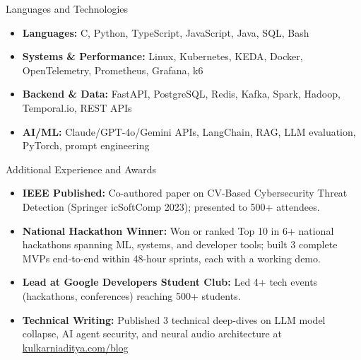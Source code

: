 \documentclass[]{mcdowellcv}
\begin{document}
\begin{cvsection}{Languages and Technologies}
  \begin{cvsubsection}{}{}{}
    \begin{itemize}
      \item \textbf{Languages:} C, Python, TypeScript, JavaScript, Java, SQL, Bash
      \item \textbf{Systems \& Performance:} Linux, Kubernetes, KEDA, Docker, OpenTelemetry, Prometheus, Grafana, k6
      \item \textbf{Backend \& Data:} FastAPI, PostgreSQL, Redis, Kafka, Spark, Hadoop, Temporal.io, REST APIs
      \item \textbf{AI/ML:} Claude/GPT-4o/Gemini APIs, LangChain, RAG, LLM evaluation, PyTorch, prompt engineering
    \end{itemize}
  \end{cvsubsection}
\end{cvsection}

\begin{cvsection}{Additional Experience and Awards}
  \begin{cvsubsection}{}{}{}
    \begin{itemize}
      \item \textbf{IEEE Published:} Co-authored paper on CV-Based Cybersecurity Threat Detection (Springer icSoftComp 2023); presented to 500+ attendees.
      \item \textbf{National Hackathon Winner:} Won or ranked Top 10 in 6+ national hackathons spanning ML, systems, and developer tools; built 3 complete MVPs end-to-end within 48-hour sprints, each with a working demo.
      \item \textbf{Lead at Google Developers Student Club:} Led 4+ tech events (hackathons, conferences) reaching 500+ students.
      \item \textbf{Technical Writing:} Published 3 technical deep-dives on LLM model collapse, AI agent security, and neural audio architecture at \href{https://www.kulkarniaditya.com/blog}{kulkarniaditya.com/blog}
    \end{itemize}
  \end{cvsubsection}
\end{cvsection}
\end{document}
